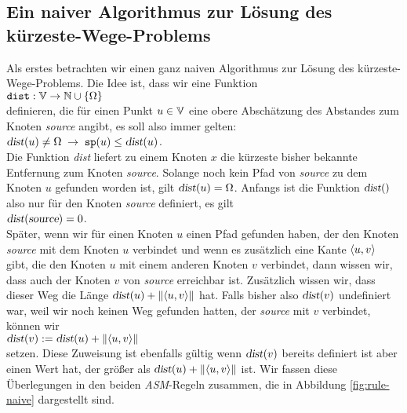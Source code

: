 \subsection{Ein naiver Algorithmus zur L\"osung des k\"urzeste-Wege-Problems}
Als erstes betrachten wir einen ganz naiven Algorithmus zur L\"osung des k\"urzeste-Wege-Problems.
Die Idee ist, dass wir eine Funktion \\[0.2cm]
\hspace*{1.3cm} $\texttt{dist}: {\mathbb V} \rightarrow {\mathbb N} \cup \{\Omega\}$ \\[0.2cm]
definieren, die f\"ur einen Punkt $u \in {\mathbb V}$ eine obere Absch\"atzung des Abstandes zum Knoten
\textsl{source} angibt, es soll also immer gelten: \\[0.2cm]
\hspace*{1.3cm} $\textsl{dist}(u) \not= \Omega \;\rightarrow\; \mbox{\tt sp}(u) \leq
\textsl{dist}(u)$. \\[0.2cm]
Die Funktion \textsl{dist} liefert zu einem Knoten $x$ die k\"urzeste bisher
bekannte Entfernung zum Knoten \textsl{source}.  Solange noch kein Pfad von
\textsl{source} zu dem Knoten $u$ gefunden worden ist, gilt $\textsl{dist}(u) = \Omega$.
Anfangs ist die Funktion $\textsl{dist}()$ also nur f\"ur den Knoten \textsl{source}
definiert, es gilt \\[0.2cm]
\hspace*{1.3cm} $\textsl{dist}(\textsl{source}) = 0$. \\[0.2cm]
Sp\"ater, wenn wir f\"ur einen Knoten $u$ einen Pfad gefunden haben, der den Knoten
\textsl{source} mit dem Knoten $u$ verbindet und wenn es zus\"atzlich eine Kante
$\pair(u,v)$ gibt, die den Knoten $u$ mit einem anderen Knoten $v$ verbindet, dann wissen
wir, dass auch der Knoten $v$ von \textsl{source} erreichbar ist.  Zus\"atzlich wissen wir,
dass dieser Weg die L\"ange $\textsl{dist}(u) + \weight{\pair(u,v)}$ hat.  Falls bisher also
$\textsl{dist}(v)$ undefiniert war, weil wir noch keinen Weg gefunden hatten, der
\textsl{source} mit $v$ verbindet, k\"onnen wir \\
\hspace*{1.3cm} $\textsl{dist}(v) := \textsl{dist}(u) + \weight{\pair(u,v)}$ \\[0.2cm]
setzen.  Diese Zuweisung ist ebenfalls g\"ultig wenn $\textsl{dist}(v)$ bereits definiert
ist aber einen Wert hat, der gr\"o{\ss}er als $\textsl{dist}(u) + \weight{\pair(u,v)}$ ist.
Wir fassen diese \"Uberlegungen in den beiden
\textsl{ASM}-Regeln zusammen, die in Abbildung \ref{fig:rule-naive} dargestellt sind.  
